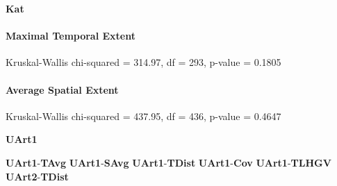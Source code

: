 \large
\centerline{\textbf{Kat}}
\normalsize

\paragraph{Maximal Temporal Extent}
Kruskal-Wallis chi-squared = 314.97, df = 293, p-value = 0.1805

\paragraph{Average Spatial Extent}
Kruskal-Wallis chi-squared = 437.95, df = 436, p-value = 0.4647

\Large
\centerline{\textbf{UArt1}}
\normalsize
\textbf{UArt1}-\textbf{TAvg}
\textbf{UArt1}-\textbf{SAvg}
\textbf{UArt1}-\textbf{TDist}
\textbf{UArt1}-\textbf{Cov}
\textbf{UArt1}-\textbf{TLHGV}
\textbf{UArt2}-\textbf{TDist}




